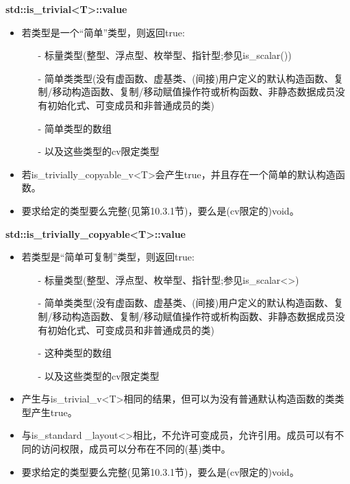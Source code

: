 \textbf{std::is\_trivial<T>::value}

\begin{itemize}
\item 
若类型是一个“简单”类型，则返回true:

\begin{itemize}
\item [-]
标量类型(整型、浮点型、枚举型、指针型;参见is\_scalar())

\item [-]
简单类类型(没有虚函数、虚基类、(间接)用户定义的默认构造函数、复制/移动构造函数、复制/移动赋值操作符或析构函数、非静态数据成员没有初始化式、可变成员和非普通成员的类)

\item [-]
简单类型的数组

\item [-]
以及这些类型的cv限定类型
\end{itemize}

\item 
若is\_trivially\_copyable\_v<T>会产生true，并且存在一个简单的默认构造函数。

\item 
要求给定的类型要么完整(见第10.3.1节)，要么是(cv限定的)void。
\end{itemize}

\textbf{std::is\_trivially\_copyable<T>::value}

\begin{itemize}
\item 
若类型是“简单可复制”类型，则返回true:

\begin{itemize}
\item [-]
标量类型(整型、浮点型、枚举型、指针型;参见is\_scalar<>)

\item [-]
简单类类型(没有虚函数、虚基类、(间接)用户定义的默认构造函数、复制/移动构造函数、复制/移动赋值操作符或析构函数、非静态数据成员没有初始化式、可变成员和非普通成员的类)

\item [-]
这种类型的数组

\item [-]
以及这些类型的cv限定类型
\end{itemize}

\item 
产生与is\_trivial\_v<T>相同的结果，但可以为没有普通默认构造函数的类类型产生true。

\item 
与is\_standard \_layout<>相比，不允许可变成员，允许引用。成员可以有不同的访问权限，成员可以分布在不同的(基)类中。

\item 
要求给定的类型要么完整(见第10.3.1节)，要么是(cv限定的)void。
\end{itemize}

